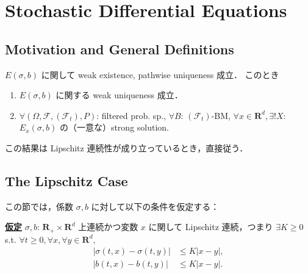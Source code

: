 \documentclass{jsarticle}
\title{}
\author{}
\date{
}
\begin{document}
\setcounter{section}{7}
\section{Stochastic Differential Equations}
\subsection{Motivation and General Definitions}

\begin{screen}
    \begin{thm*}
        $E(\sigma, b)$ に関して weak existence, pathwise uniqueness 成立．
        このとき
        \begin{enumerate}[label=(\roman*)]
            \item
            $E(\sigma, b)$ に関する weak uniqueness 成立．
            \item
            $\forall (\Omega, \mathcal{F}, (\mathcal{F}_t), P)$: filtered prob. sp., $\forall B$: $(\mathcal{F}_t)$-BM, $\forall x\in\mathbf{R}^d, \exists! X$: $E_x(\sigma, b)$ の（一意な）strong solution.
        \end{enumerate}
    \end{thm*}
\end{screen}

この結果は Lipschitz 連続性が成り立っているとき，直接従う．

\subsection{The Lipschitz Case}

この節では，係数 $\sigma, b$ に対して以下の条件を仮定する：
\begin{screen}
    \textbf{\underline{仮定} }
    $\sigma, b$: $\mathbf{R_+}\times\mathbf{R}^d$ 上連続かつ変数 $x$ に関して Lipschitz 連続，つまり $\exists K\ge0$ s.t. $\forall t\ge0, \forall x, \forall y\in\mathbf{R}^d,$
    \begin{align}
        \left\lvert\sigma(t, x)-\sigma(t, y)\right\rvert
        &\le K\left\lvert x-y\right\rvert, \\
        \left\lvert b(t, x)-b(t, y)\right\rvert
        &\le K\left\lvert x-y\right\rvert.
    \end{align}
\end{screen}
\end{document}
